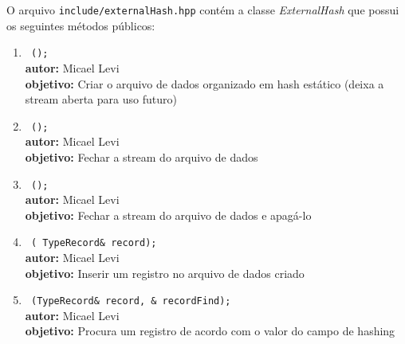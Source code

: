 \newpage
O arquivo \texttt{include/externalHash.hpp} contém a classe \emph{ExternalHash} que possui os seguintes métodos públicos:
\begin{enumerate} %
\setlength\itemsep{1em}

\item \texttt{ ();} \\
    \noindent \textbf{autor:} Micael Levi \\
    \noindent \textbf{objetivo:} Criar o arquivo de dados organizado em hash estático (deixa a stream aberta para uso futuro)


\item \texttt{ ();} \\
    \noindent \textbf{autor:} Micael Levi \\
    \noindent \textbf{objetivo:} Fechar a stream do arquivo de dados


\item \texttt{ ();} \\
    \noindent \textbf{autor:} Micael Levi \\
    \noindent \textbf{objetivo:} Fechar a stream do arquivo de dados e apagá-lo


\item \texttt{ ( TypeRecord\& record);} \\
    \noindent \textbf{autor:} Micael Levi \\
    \noindent \textbf{objetivo:} Inserir um registro no arquivo de dados criado


\item \texttt{ (TypeRecord\& record, \& recordFind);} \\
    \noindent \textbf{autor:} Micael Levi \\
    \noindent \textbf{objetivo:} Procura um registro de acordo com o valor do campo de hashing

\end{enumerate}


